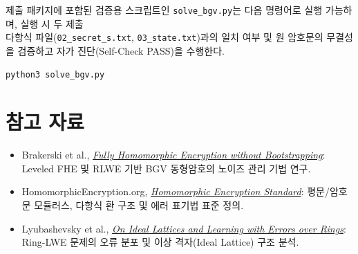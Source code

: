 \documentclass[10pt,a4paper]{article}
\begin{document}
제출 패키지에 포함된 검증용 스크립트인 \texttt{solve\_bgv.py}는 다음 명령어로 실행 가능하며, 실행 시 두 제출 \\
 다항식 파일(\texttt{02\_secret\_s.txt}, \texttt{03\_state.txt})과의 일치 여부 및 원 암호문의 무결성을 검증하고 자가 진단(Self-Check PASS)을 수행한다.

\begin{lstlisting}
python3 solve_bgv.py
\end{lstlisting}

\section{참고 자료}

\begin{itemize}
  \item Brakerski et al.,
    \href{https://eprint.iacr.org/2011/277}
    {\emph{Fully Homomorphic Encryption without Bootstrapping}}: Leveled FHE 및 RLWE 기반 BGV 동형암호의 노이즈 관리 기법 연구.
  \item HomomorphicEncryption.org,
    \href{https://homomorphicencryption.org/standard/}
    {\emph{Homomorphic Encryption Standard}}: 평문/암호문 모듈러스, 다항식 환 구조 및 에러 표기법 표준 정의.
  \item Lyubashevsky et al.,
    \href{https://eprint.iacr.org/2012/230}
    {\emph{On Ideal Lattices and Learning with Errors over Rings}}: Ring-LWE 문제의 오류 분포 및 이상 격자(Ideal Lattice) 구조 분석.
\end{itemize}
\end{document}
